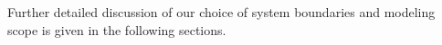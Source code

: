 \documentclass{article}
\renewcommand\_{\textunderscore\allowbreak}
\begin{document}

Further detailed discussion of our choice of system boundaries and modeling scope is given in the following sections. 


 
\providecommand{\X}{\cellcolor{cellcolor}}
\providecommand{\anonstrut}{\rule{0pt}{5.5pt}}
 
 
\end{document}
